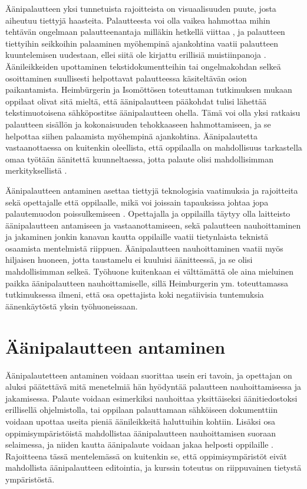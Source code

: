 \documentclass[utf8]{gradu3}
\begin{document}
Äänipalautteen yksi tunnetuista rajoitteista on visuaalisuuden puute, josta aiheutuu tiettyjä haasteita. Palautteesta voi olla vaikea hahmottaa mihin tehtävän ongelmaan palautteenantaja milläkin hetkellä viittaa \parencite[][]{versus}, ja palautteen tiettyihin seikkoihin palaaminen myöhempinä ajankohtina vaatii palautteen kuuntelemisen uudestaan, ellei siitä ole kirjattu erillisiä muistiinpanoja \parencite[][]{evaluating}. Äänileikkeiden upottaminen tekstidokumentteihin tai ongelmakohdan selkeä osoittaminen suullisesti helpottavat palautteessa käsiteltävän osion paikantamista. Heimbürgerin ja Isomöttösen \parencite*[][]{moderating} toteuttaman tutkimuksen mukaan oppilaat olivat sitä mieltä, että äänipalautteen pääkohdat tulisi lähettää tekstimuotoisena sähköpostitse äänipalautteen ohella. Tämä voi olla yksi ratkaisu palautteen sisällön ja kokonaisuuden tehokkaaseen hahmottamiseen, ja se helpottaa siihen palaamista myöhempinä ajankohtina. Äänipalautetta vastaanottaessa on kuitenkin oleellista, että oppilaalla on mahdollisuus tarkastella omaa työtään äänitettä kuunneltaessa, jotta palaute olisi mahdollisimman merkityksellistä \parencite[][]{usingAudio}.

Äänipalautteen antaminen asettaa tiettyjä teknologisia vaatimuksia ja rajoitteita sekä opettajalle että oppilaalle, mikä voi joissain tapauksissa johtaa jopa palautemuodon poissulkemiseen \parencite[][]{developing}. Opettajalla ja oppilailla täytyy olla laitteisto äänipalautteen antamiseen ja vastaanottamiseen, sekä palautteen nauhoittaminen ja jakaminen jonkin kanavan kautta oppilaille vaatii tietynlaista teknistä osaamista mentelmistä riippuen. Äänipalautteen nauhoittaminen vaatii myös hiljaisen huoneen, jotta taustamelu ei kuuluisi äänitteessä, ja se olisi mahdollisimman selkeä. Työhuone kuitenkaan ei välttämättä ole aina mieluinen paikka äänipalautteen nauhoittamiselle, sillä Heimburgerin ym. \parencite*[][]{academics} toteuttamassa tutkimuksessa ilmeni, että osa opettajista koki negatiivisia tuntemuksia äänenkäytöstä yksin työhuoneissaan.  

\section{Äänipalautteen antaminen}

Äänipalautetteen antaminen voidaan suorittaa usein eri tavoin, ja opettajan on aluksi päätettävä mitä menetelmiä hän hyödyntää palautteen nauhoittamisessa ja jakamisessa. Palaute voidaan esimerkiksi nauhoittaa yksittäiseksi äänitiedostoksi erillisellä ohjelmistolla, tai oppilaan palauttamaan sähköiseen dokumenttiin voidaan upottaa useita pieniä äänileikkeitä haluttuihin kohtiin. Lisäksi osa oppimisympäristöistä mahdollistaa äänipalautteen nauhoittamisen suoraan selaimessa, ja niiden kautta äänipalaute voidaan jakaa helposti oppilaille \parencite[][]{using}. Rajoitteena tässä mentelemässä on kuitenkin se, että oppimisympäristöt eivät mahdollista äänipalautteen editointia, ja kurssin toteutus on riippuvainen tietystä ympäristöstä.
\end{document}
